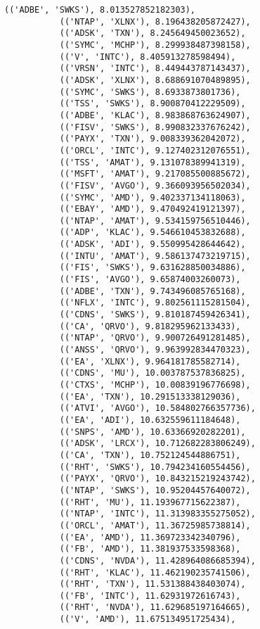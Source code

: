 \documentclass[11pt]{article}
\begin{document}
\begin{Verbatim}[commandchars=\\\{\}]
           (('ADBE', 'SWKS'), 8.013527852182303),
           (('NTAP', 'XLNX'), 8.196438205872427),
           (('ADSK', 'TXN'), 8.245649450023652),
           (('SYMC', 'MCHP'), 8.299938487398158),
           (('V', 'INTC'), 8.405913278598494),
           (('VRSN', 'INTC'), 8.449443787143437),
           (('ADSK', 'XLNX'), 8.688691070489895),
           (('SYMC', 'SWKS'), 8.6933873801736),
           (('TSS', 'SWKS'), 8.900870412229509),
           (('ADBE', 'KLAC'), 8.983868763624907),
           (('FISV', 'SWKS'), 8.990832337676242),
           (('PAYX', 'TXN'), 9.008339362042072),
           (('ORCL', 'INTC'), 9.127402312076551),
           (('TSS', 'AMAT'), 9.131078389941319),
           (('MSFT', 'AMAT'), 9.217085500885672),
           (('FISV', 'AVGO'), 9.366093956502034),
           (('SYMC', 'AMD'), 9.402337134118063),
           (('EBAY', 'AMD'), 9.470492419121397),
           (('NTAP', 'AMAT'), 9.534159756510446),
           (('ADP', 'KLAC'), 9.546610453832688),
           (('ADSK', 'ADI'), 9.550995428644642),
           (('INTU', 'AMAT'), 9.586137473219715),
           (('FIS', 'SWKS'), 9.631628850034886),
           (('FIS', 'AVGO'), 9.65874003260073),
           (('ADBE', 'TXN'), 9.743496085765168),
           (('NFLX', 'INTC'), 9.802561115281504),
           (('CDNS', 'SWKS'), 9.810187459426341),
           (('CA', 'QRVO'), 9.818295962133433),
           (('NTAP', 'QRVO'), 9.900726491281485),
           (('ANSS', 'QRVO'), 9.963992834470323),
           (('EA', 'XLNX'), 9.964181785582714),
           (('CDNS', 'MU'), 10.003787537836825),
           (('CTXS', 'MCHP'), 10.00839196776698),
           (('EA', 'TXN'), 10.291513338129036),
           (('ATVI', 'AVGO'), 10.584802766357736),
           (('EA', 'ADI'), 10.632559611184648),
           (('SNPS', 'AMD'), 10.63366920282201),
           (('ADSK', 'LRCX'), 10.712682283806249),
           (('CA', 'TXN'), 10.752124544886751),
           (('RHT', 'SWKS'), 10.794234160554456),
           (('PAYX', 'QRVO'), 10.843215219243742),
           (('NTAP', 'SWKS'), 10.95204457640072),
           (('RHT', 'MU'), 11.193967715622387),
           (('NTAP', 'INTC'), 11.313983355275052),
           (('ORCL', 'AMAT'), 11.36725985738814),
           (('EA', 'AMD'), 11.369723342340796),
           (('FB', 'AMD'), 11.381937533598368),
           (('CDNS', 'NVDA'), 11.428964086685394),
           (('RHT', 'KLAC'), 11.462190235741506),
           (('RHT', 'TXN'), 11.531388438403074),
           (('FB', 'INTC'), 11.62931972616743),
           (('RHT', 'NVDA'), 11.629685197164665),
           (('V', 'AMD'), 11.675134951725434),

\end{Verbatim}
\end{document}
